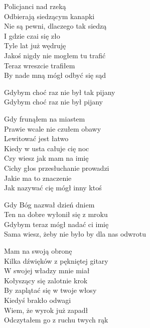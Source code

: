 \begin{text}
Policjanci nad rzeką\\
Odbierają siedzącym kanapki\\
Nie są pewni, dlaczego tak siedzą\\
I gdzie czai się zło\\
Tyle lat już wędruję\\
Jakoś nigdy nie mogłem tu trafić\\
Teraz wreszcie trafiłem\\
By nade mną mógł odbyć się sąd

\vin Gdybym choć raz nie był tak pijany\\
\vin Gdybym choć raz nie był pijany

Gdy frunąłem na miastem\\
Prawie wcale nie czułem obawy\\
Lewitować jest łatwo\\
Kiedy w usta całuje cię noc\\
Czy wiesz jak mam na imię\\
Cichy głos przesłuchanie prowadzi\\
Jakie ma to znaczenie\\
Jak nazywać cię mógł inny ktoś

\vin Gdy Bóg nazwał dzień dniem\\
\vin Ten na dobre wyłonił się z mroku\\
\vin Gdybym teraz mógł nadać ci imię\\
\vin Sama wiesz, żeby nie było by dla nas odwrotu

Mam na swoją obronę\\
Kilka dźwięków z pękniętej gitary\\
W swojej władzy mnie miał\\
Kołyszący się zalotnie krok\\
By zaplątać się w twoje włosy\\
Kiedyś brakło odwagi\\
Wiem, że wyrok już zapadł\\
Odczytałem go z ruchu twych rąk
\end{text}
